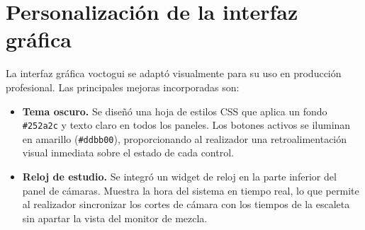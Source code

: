 \section{Personalización de la interfaz gráfica}
\label{sec:gui_personalizacion}

La interfaz gráfica voctogui se adaptó visualmente para su uso en producción profesional.
Las principales mejoras incorporadas son:

\begin{itemize}

  \item \textbf{Tema oscuro.} Se diseñó una hoja de estilos CSS que aplica un fondo
  \texttt{\#252a2c} y texto claro en todos los paneles. Los botones activos se iluminan
  en amarillo (\texttt{\#ddbb00}), proporcionando al realizador una retroalimentación
  visual inmediata sobre el estado de cada control.

  \item \textbf{Reloj de estudio.} Se integró un widget de reloj en la parte inferior
  del panel de cámaras. Muestra la hora del sistema en tiempo real, lo que permite al
  realizador sincronizar los cortes de cámara con los tiempos de la escaleta sin apartar
  la vista del monitor de mezcla.

\end{itemize}

